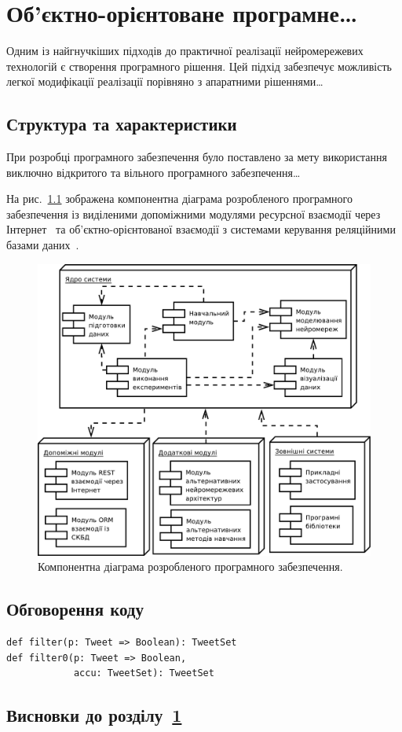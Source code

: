\chapter{Об'єктно-орієнтоване програмне\ldots}\label{ch:03}

  Одним із найгнучкіших підходів до практичної реалізації нейромережевих технологій є створення програмного рішення. Цей підхід забезпечує можливість легкої модифікації реалізації порівняно з апаратними рішеннями\ldots 
  
\section{Структура та характеристики}
  
  При розробці програмного забезпечення було поставлено за мету використання виключно відкритого та вільного програмного забезпечення\ldots
  
  На рис.~\ref{fig:neurosimulator-modules} зображена компонентна діаграма розробленого програмного забезпечення із виділеними допоміжними модулями ресурсної взаємодії через Інтернет~\cite{Fie2000} та об'єктно-орієнтованої взаємодії з системами керування реляційними базами даних~\cite{ChGa2006}. 
  
  \begin{figure}[!htb]
    \centering
    \includegraphics[scale=0.5]{chapters/03-software-and-experiments/images/01-neurosimulator-component-diagram.pdf}%
    \caption{Компонентна діаграма розробленого програмного забезпечення.}\label{fig:neurosimulator-modules}
  \end{figure}
  
  
\section{Обговорення коду}

\begin{lstlisting}
def filter(p: Tweet => Boolean): TweetSet
def filter0(p: Tweet => Boolean, 
            accu: TweetSet): TweetSet
\end{lstlisting}


\section{Висновки до розділу~\ref{ch:03}}